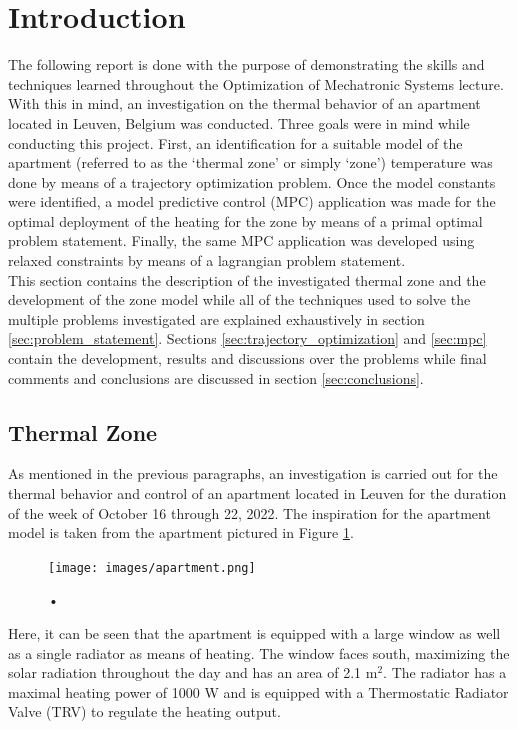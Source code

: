 \section{Introduction}
\label{sec:intro}
The following report is done with the purpose of demonstrating the skills and techniques learned throughout the Optimization of Mechatronic Systems lecture. With this in mind, an investigation on the thermal behavior of an apartment located in Leuven, Belgium was conducted. Three goals were in mind while conducting this project. First, an identification for a suitable model of the apartment (referred to as the `thermal zone' or simply `zone') temperature was done by means of a trajectory optimization problem. Once the model constants were identified, a model predictive control (MPC) application was made for the optimal deployment of the heating for the zone by means of a primal optimal problem statement. Finally, the same MPC application was developed using relaxed constraints by means of a lagrangian problem statement. \\

This section contains the description of the investigated thermal zone and the development of the zone model while all of the techniques used to solve the multiple problems investigated are explained exhaustively in section \ref{sec:problem_statement}. Sections \ref{sec:trajectory_optimization} and \ref{sec:mpc} contain the development, results and discussions over the problems while final comments and conclusions are discussed in section \ref{sec:conclusions}.

\subsection{Thermal Zone}
\label{subsec:thermal_zone}
As mentioned in the previous paragraphs, an investigation is carried out for the thermal behavior and control of an apartment located in Leuven for the duration of the week of October 16 through 22, 2022. The inspiration for the apartment model is taken from the apartment pictured in Figure \ref{fig:apartment}.

\begin{figure}[H]
\centering
\texttt{[image: images/apartment.png]}
\caption{•}
\label{fig:apartment}
\end{figure}

Here, it can be seen that the apartment is equipped with a large window as well as a single radiator as means of heating. The window faces south, maximizing the solar radiation throughout the day and has an area of 2.1 m$^2$. The radiator has a maximal heating power of 1000 W and is equipped with a Thermostatic Radiator Valve (TRV) to regulate the heating output.

